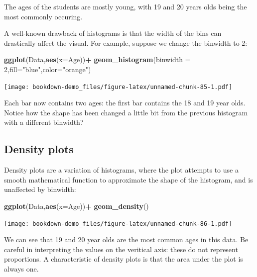 \documentclass[
]{book}
\newenvironment{Shaded}{\begin{snugshade}}{\end{snugshade}}
\newcommand{\AttributeTok}[1]{\textcolor[rgb]{0.13,0.29,0.53}{#1}}
\newcommand{\DecValTok}[1]{\textcolor[rgb]{0.00,0.00,0.81}{#1}}
\newcommand{\FunctionTok}[1]{\textcolor[rgb]{0.13,0.29,0.53}{\textbf{#1}}}
\newcommand{\NormalTok}[1]{#1}
\newcommand{\SpecialCharTok}[1]{\textcolor[rgb]{0.81,0.36,0.00}{\textbf{#1}}}
\newcommand{\StringTok}[1]{\textcolor[rgb]{0.31,0.60,0.02}{#1}}
\begin{document}
The ages of the students are mostly young, with 19 and 20 years olds being the most commonly occuring.

A well-known drawback of histograms is that the width of the bins can drastically affect the visual. For example, suppose we change the binwidth to 2:

\begin{Shaded}
\begin{Highlighting}[]
\FunctionTok{ggplot}\NormalTok{(Data,}\FunctionTok{aes}\NormalTok{(}\AttributeTok{x=}\NormalTok{Age))}\SpecialCharTok{+}
  \FunctionTok{geom\_histogram}\NormalTok{(}\AttributeTok{binwidth =} \DecValTok{2}\NormalTok{,}\AttributeTok{fill=}\StringTok{"blue"}\NormalTok{,}\AttributeTok{color=}\StringTok{"orange"}\NormalTok{)}
\end{Highlighting}
\end{Shaded}

\texttt{[image: bookdown-demo\_files/figure-latex/unnamed-chunk-85-1.pdf]}

Each bar now contains two ages: the first bar contains the 18 and 19 year olds. Notice how the shape has been changed a little bit from the previous histogram with a different binwidth?

\hypertarget{density-plots}{%
\subsection{Density plots}\label{density-plots}}

Density plots are a variation of histograms, where the plot attempts to use a smooth mathematical function to approximate the shape of the histogram, and is unaffected by binwidth:

\begin{Shaded}
\begin{Highlighting}[]
\FunctionTok{ggplot}\NormalTok{(Data,}\FunctionTok{aes}\NormalTok{(}\AttributeTok{x=}\NormalTok{Age))}\SpecialCharTok{+}
  \FunctionTok{geom\_density}\NormalTok{()}
\end{Highlighting}
\end{Shaded}

\texttt{[image: bookdown-demo\_files/figure-latex/unnamed-chunk-86-1.pdf]}

We can see that 19 and 20 year olds are the most common ages in this data. Be careful in interpreting the values on the veritical axis: these do not represent proportions. A characteristic of density plots is that the area under the plot is always one.
\end{document}
